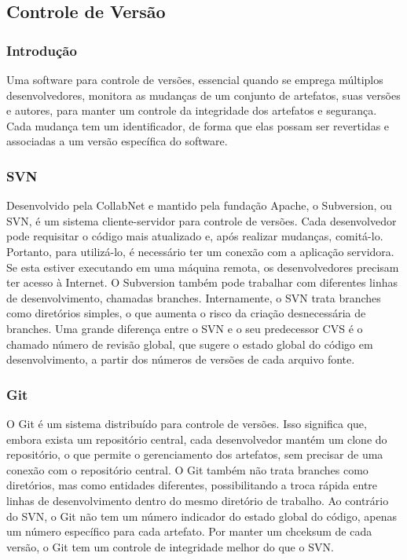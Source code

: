 \documentclass[12pt,a4paper]{article}
\begin{document}
	\clearpage		
	\subsection{Controle de Versão}
	
		\subsubsection{Introdução}
		
			Uma software para controle de versões, essencial quando
			se emprega múltiplos desenvolvedores, monitora as mudanças
			de um conjunto de artefatos, suas versões e autores, para
			manter um controle da integridade dos artefatos e segurança.
			Cada mudança tem um identificador, de forma que elas
			possam ser revertidas e associadas a um versão específica
			do software.
			
		\subsubsection{SVN}
		
			Desenvolvido pela CollabNet e mantido pela fundação Apache, o Subversion,
			ou SVN, é um sistema cliente-servidor para controle de versões. Cada
			desenvolvedor pode requisitar o código mais atualizado e, após realizar
			mudanças, comitá-lo. Portanto, para utilizá-lo, é necessário ter um conexão
			com a aplicação servidora. Se esta estiver executando em uma máquina remota,
			os desenvolvedores precisam ter acesso à Internet.
			O Subversion também pode trabalhar com diferentes linhas de desenvolvimento,
			chamadas branches. Internamente, o SVN trata branches como diretórios simples,
			o que aumenta o risco da criação desnecessária de branches.
			Uma grande diferença entre o SVN e o seu predecessor CVS é o chamado número
			de revisão global, que sugere o estado global do código em desenvolvimento,
			a partir dos números de versões de cada arquivo fonte.
			
		\subsubsection{Git}
		
			O Git é um sistema distribuído para controle de versões. Isso significa
			que, embora exista um repositório central, cada desenvolvedor mantém
			um clone do repositório, o que permite o gerenciamento dos artefatos,
			sem precisar de uma conexão com o repositório central.
			O Git também não trata branches como diretórios, mas como entidades
			diferentes, possibilitando a troca rápida entre linhas de desenvolvimento
			dentro do mesmo diretório de trabalho.
			Ao contrário do SVN, o Git não tem um número indicador do estado global
			do código, apenas um número específico para cada artefato.
			Por manter um chceksum de cada versão, o Git tem um controle
			de integridade melhor do que o SVN.
			
\end{document}
